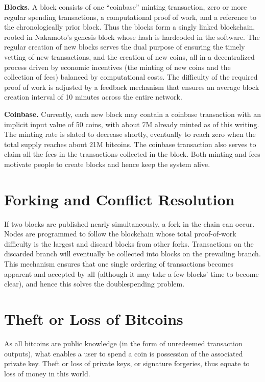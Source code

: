 \textbf{Blocks.} A block consists of one “coinbase” minting transaction, zero or more regular
spending transactions, a computational proof of work, and a reference to the chronologically
prior block. Thus the blocks form a singly linked blockchain, rooted in Nakamoto’s
genesis block whose hash is hardcoded in the software. The regular creation of new
blocks serves the dual purpose of ensuring the timely vetting of new transactions, and
the creation of new coins, all in a decentralized process driven by economic incentives
(the minting of new coins and the collection of fees) balanced by computational costs.
The difficulty of the required proof of work is adjusted by a feedback mechanism that
ensures an average block creation interval of 10 minutes across the entire network.

\textbf{Coinbase.} Currently, each new block may contain a coinbase transaction with an implicit
input value of 50 coins, with about 7M already minted as of this writing. The
minting rate is slated to decrease shortly, eventually to reach zero when the total supply
reaches about 21M bitcoins. The coinbase transaction also serves to claim all the fees in
the transactions collected in the block. Both minting and fees motivate people to create
blocks and hence keep the system alive.

\section{Forking and Conflict Resolution}
If two blocks are published nearly simultaneously, a fork in the chain can occur. Nodes
are programmed to follow the blockchain whose total proof-of-work difficulty is the
largest and discard blocks from other forks. Transactions on the discarded branch will
eventually be collected into blocks on the prevailing branch. This mechanism ensures
that one single ordering of transactions becomes apparent and accepted by all (although
it may take a few blocks’ time to become clear), and hence this solves the doublespending
problem.

\section{Theft or Loss of Bitcoins}
As all bitcoins are public knowledge (in the form of unredeemed transaction outputs),
what enables a user to spend a coin is possession of the associated private key. Theft or
loss of private keys, or signature forgeries, thus equate to loss of money in this world\cite{elias2011bitcoin}.

